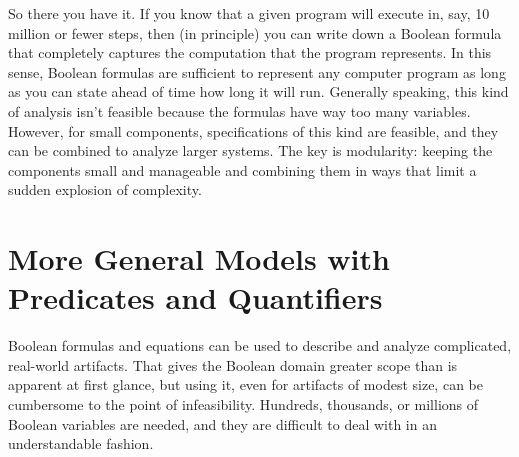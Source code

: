 {{So there you have it.
If you know that a given program will execute in, say, 10 million or fewer steps,
then (in principle) you can
write down a Boolean formula that completely captures the computation
that the program represents.
In this sense, Boolean formulas are sufficient to
represent any computer program
as long as you can state ahead of time how long it will run.
Generally speaking, this kind of analysis isn't feasible
because the formulas have way too many variables.
However, for small components,
specifications of this kind are feasible, and they can be combined
to analyze larger systems. The key is modularity: keeping the
components small and manageable and combining them in
ways that limit a sudden explosion of complexity.

\begin{exercises}



\end{exercises}

\section{More General Models with Predicates and Quantifiers}
\label{sec:predicates}

Boolean formulas and equations can be used
to describe and analyze complicated, real-world artifacts.
That gives the Boolean domain greater scope than is apparent at first glance,
but using it, even for artifacts of modest size,
can be cumbersome to the point of infeasibility.
Hundreds, thousands, or millions of Boolean variables are needed,
and they are difficult to deal with in an understandable fashion.

}}
